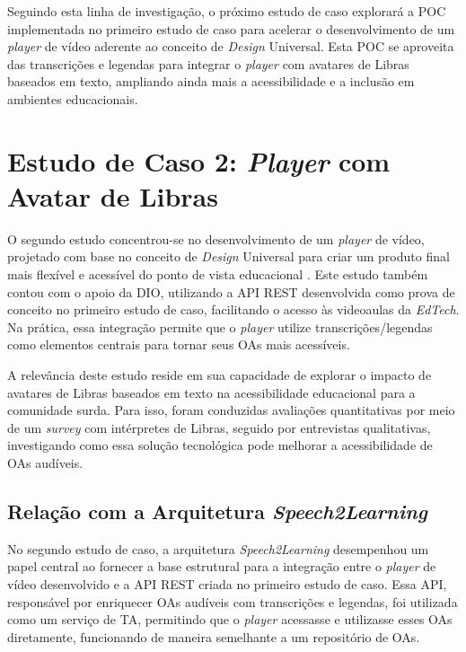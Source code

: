 Seguindo esta linha de investigação, o próximo estudo de caso explorará a POC implementada no primeiro estudo de caso para acelerar o desenvolvimento de um \textit{player} de vídeo aderente ao conceito de \textit{Design} Universal. Esta POC se aproveita das transcrições e legendas para integrar o \textit{player} com avatares de Libras baseados em texto, ampliando ainda mais a acessibilidade e a inclusão em ambientes educacionais.

\section{Estudo de Caso 2: \textit{Player} com Avatar de Libras}
\label{c4:cs2}

O segundo estudo concentrou-se no desenvolvimento de um \textit{player} de vídeo, projetado com base no conceito de \textit{Design} Universal para criar um produto final mais flexível e acessível do ponto de vista educacional \cite{UNESCO2023, GovBr2023}. Este estudo também contou com o apoio da DIO, utilizando a API REST desenvolvida como prova de conceito no primeiro estudo de caso, facilitando o acesso às videoaulas da \textit{EdTech}. Na prática, essa integração permite que o \textit{player} utilize transcrições/legendas como elementos centrais para tornar seus OAs mais acessíveis.

A relevância deste estudo reside em sua capacidade de explorar o impacto de avatares de Libras baseados em texto na acessibilidade educacional para a comunidade surda. Para isso, foram conduzidas avaliações quantitativas por meio de um \textit{survey} com intérpretes de Libras, seguido por entrevistas qualitativas, investigando como essa solução tecnológica pode melhorar a acessibilidade de OAs audíveis.

\subsection{Relação com a Arquitetura \textit{Speech2Learning}}

No segundo estudo de caso, a arquitetura \textit{Speech2Learning} desempenhou um papel central ao fornecer a base estrutural para a integração entre o \textit{player} de vídeo desenvolvido e a API REST criada no primeiro estudo de caso. Essa API, responsável por enriquecer OAs audíveis com transcrições e legendas, foi utilizada como um serviço de TA, permitindo que o \textit{player} acessasse e utilizasse esses OAs diretamente, funcionando de maneira semelhante a um repositório de OAs.

